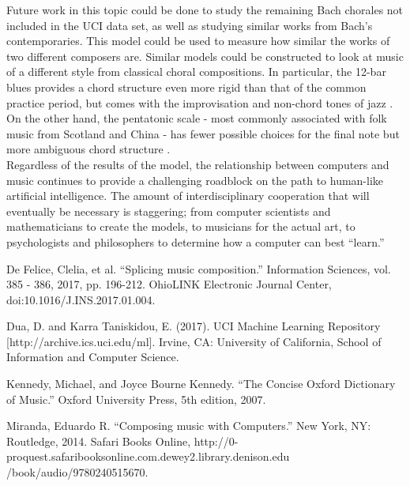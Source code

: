 \documentclass[12pt]{article}
\begin{document}
Future work in this topic could be done to study the remaining Bach chorales not included in the UCI data set, as well as studying similar works from Bach's contemporaries. This model could be used to measure how similar the works of two different composers are. Similar models could be constructed to look at music of a different style from classical choral compositions. In particular, the 12-bar blues provides a chord structure even more rigid than that of the common practice period, but comes with the improvisation and non-chord tones of jazz \cite{music_dict}. On the other hand, the pentatonic scale - most commonly associated with folk music from Scotland and China - has fewer possible choices for the final note but more ambiguous chord structure \cite{music_dict}.\\

Regardless of the results of the model, the relationship between computers and music continues to provide a challenging roadblock on the path to human-like artificial intelligence. The amount of interdisciplinary cooperation that will eventually be necessary is staggering; from computer scientists and mathematicians to create the models, to musicians for the actual art, to psychologists and philosophers to determine how a computer can best ``learn.'' 
\newpage
\begin{thebibliography}{10}
  De Felice, Clelia, et al. ``Splicing music composition.'' Information Sciences, vol. 385 - 386, 2017, pp. 196-212. OhioLINK Electronic Journal Center, doi:10.1016/J.INS.2017.01.004.

  Dua, D. and Karra Taniskidou, E. (2017). UCI Machine Learning Repository [http://archive.ics.uci.edu/ml]. Irvine, CA: University of California, School of Information and Computer Science.

  Kennedy, Michael, and Joyce Bourne Kennedy. ``The Concise Oxford Dictionary of Music.'' Oxford University Press, 5th edition, 2007. 
  
  Miranda, Eduardo R. ``Composing music with Computers.'' New York, NY: Routledge, 2014. Safari Books Online, http://0-proquest.safaribooksonline.com.dewey2.library.denison.edu\\/book/audio/9780240515670.
\end{thebibliography}
\end{document}
